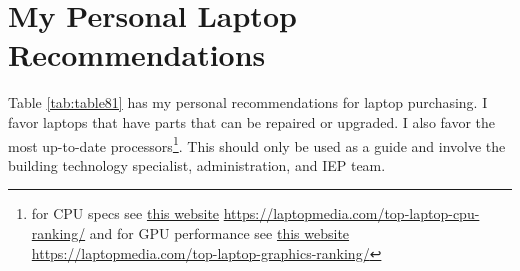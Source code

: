 \pagebreak \hypertarget{laptops-recs}{}\section{My Personal Laptop Recommendations}\label{laptops-recs}
Table \ref{tab:table81} has my personal recommendations for laptop purchasing. I favor laptops that have parts that can be repaired or upgraded. I also favor the most up-to-date processors\footnote{\raggedright for CPU specs see 
 \href{https://laptopmedia.com/top-laptop-cpu-ranking/}{this website} \url{https://laptopmedia.com/top-laptop-cpu-ranking/} and for GPU performance see \href{https://laptopmedia.com/top-laptop-graphics-ranking/}{this website} \url{https://laptopmedia.com/top-laptop-graphics-ranking/}}. This should only be used as a guide and involve the building technology specialist, administration, and IEP team.

